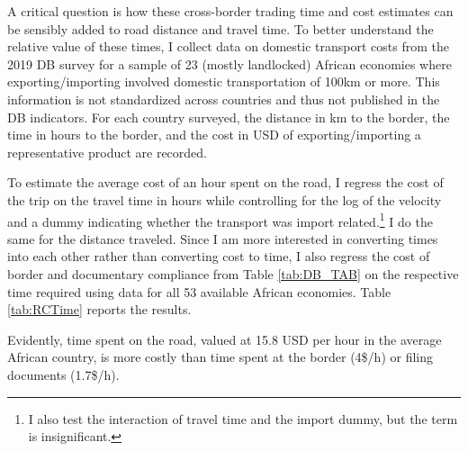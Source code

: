 \documentclass[a4paper]{article}
\begin{document}
A critical question is how these cross-border trading time and cost estimates can be sensibly added to road distance and travel time. To better understand the relative value of these times, I collect data on domestic transport costs from the 2019 DB survey for a sample of 23 (mostly landlocked) African economies where exporting/importing involved domestic transportation of 100km or more. This information is not standardized across countries and thus not published in the DB indicators. For each country surveyed, the distance in km to the border, the time in hours to the border, and the cost in USD of exporting/importing a representative product are recorded. \newline  

 To estimate the average cost of an hour spent on the road, I regress the cost of the trip on the travel time in hours while controlling for the log of the velocity and a dummy indicating whether the transport was import related.\footnote{I also test the interaction of travel time and the import dummy, but the term is insignificant.} I do the same for the distance traveled.  Since I am more interested in converting times into each other rather than converting cost to time, I also regress the cost of border and documentary compliance from Table \ref{tab:DB_TAB} on the respective time required using data for all 53 available African economies. Table \ref{tab:RCTime} reports the results. \newline 
 
 Evidently, time spent on the road, valued at 15.8 USD per hour in the average African country, is more costly than time spent at the border (4\$/h) or filing documents (1.7\$/h). 
\end{document}
